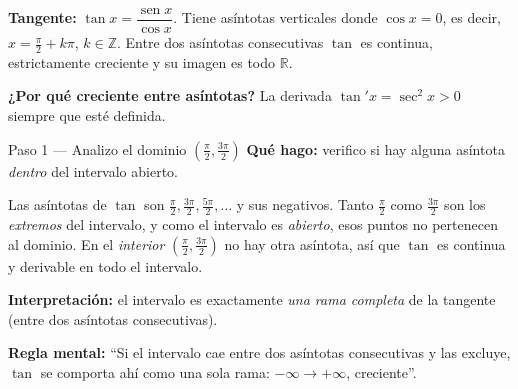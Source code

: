 \documentclass[11pt]{article}
\DeclareMathOperator{\sen}{sen}
\begin{document}
\begin{teo}
\textbf{Tangente:} $\tan x=\dfrac{\sen x}{\cos x}$. Tiene asíntotas verticales donde $\cos x=0$, es decir, $x=\tfrac{\pi}{2}+k\pi$, $k\in\mathbb{Z}$. Entre dos asíntotas consecutivas $\tan$ es continua, estrictamente creciente y su imagen es todo $\mathbb{R}$.

\textbf{¿Por qué creciente entre asíntotas?} La derivada $\tan'x=\sec^2 x>0$ siempre que esté definida.
\end{teo}

\begin{paso}{Paso 1 --- Analizo el dominio $\left(\tfrac{\pi}{2},\tfrac{3\pi}{2}\right)$}
\textbf{Qué hago:} verifico si hay alguna asíntota \emph{dentro} del intervalo abierto.

Las asíntotas de $\tan$ son $\tfrac{\pi}{2},\tfrac{3\pi}{2},\tfrac{5\pi}{2},\ldots$ y sus negativos. Tanto $\tfrac{\pi}{2}$ como $\tfrac{3\pi}{2}$ son los \emph{extremos} del intervalo, y como el intervalo es \emph{abierto}, esos puntos no pertenecen al dominio. En el \emph{interior} $\left(\tfrac{\pi}{2},\tfrac{3\pi}{2}\right)$ no hay otra asíntota, así que $\tan$ es continua y derivable en todo el intervalo.

\textbf{Interpretación:} el intervalo es exactamente \emph{una rama completa} de la tangente (entre dos asíntotas consecutivas).

\textbf{Regla mental:} ``Si el intervalo cae entre dos asíntotas consecutivas y las excluye, $\tan$ se comporta ahí como una sola rama: $-\infty\to+\infty$, creciente''.
\end{paso}
\end{document}
